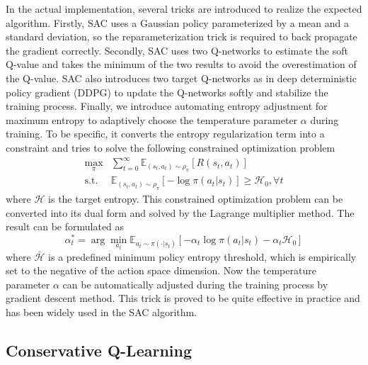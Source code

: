 In the actual implementation, several tricks are introduced to realize the expected algorithm. Firstly, SAC uses a Gaussian policy parameterized by a mean and a standard deviation, so the reparameterization trick is required to back propagate the gradient correctly. Secondly, SAC uses two Q-networks to estimate the soft Q-value and takes the minimum of the two results to avoid the overestimation of the Q-value. SAC also introduces two target Q-networks as in deep deterministic policy gradient (DDPG) \cite{lillicrap2015continuous} to update the Q-networks softly and stabilize the training process. Finally, we introduce automating entropy adjustment for maximum entropy \cite{haarnoja2018application} to adaptively choose the temperature parameter $\alpha$ during training. To be specific, it converts the entropy regularization term into a constraint and tries to solve the following constrained optimization problem
\begin{equation}
    \begin{aligned}
        \max_{\pi} & \sum \nolimits_{t=0}^{\infty} \mathbb{E}_{(s_t, a_t) \sim \rho_{\pi}} \left[ R(s_t, a_t) \right] \\
        \text{s.t. } & \mathbb{E}_{(s_t, a_t) \sim \rho_{\pi}} \left[ -\log \pi(a_t|s_t) \right] \geq \mathcal{H}_0, \forall t
    \end{aligned}
\end{equation}
where $\mathcal{H}$ is the target entropy. This constrained optimization problem can be converted into its dual form and solved by the Lagrange multiplier method. The result can be formulated as
\begin{equation}
    \alpha_t^* = \arg \min_{a_t} \mathbb{E}_{a_ t\sim \pi(\cdot|s_t)} \left[ - \alpha_t \log \pi(a_t|s_t) - \alpha_t \mathcal{H}_0 \right]
\end{equation}
where $\bar{\mathcal{H}}$ is a predefined minimum policy entropy threshold, which is empirically set to the negative of the action space dimension. Now the temperature parameter $\alpha$ can be automatically adjusted during the training process by gradient descent method. This trick is proved to be quite effective in practice and has been widely used in the SAC algorithm.

\subsection{Conservative Q-Learning}

